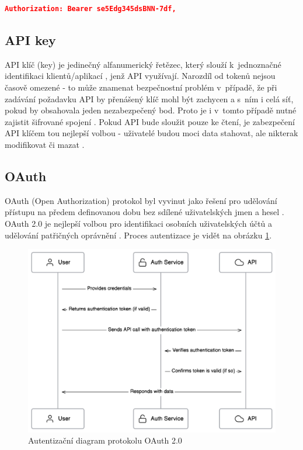 \documentclass[czech, bc, kiv, he, iso690numb]{fasthesis}
\begin{document}
\begin{lstlisting}[language=json, caption={Autorizační atribut - Bearer schéma}, label=bearerHeader]
	Authorization: Bearer se5Edg345dsBNN-7df,
\end{lstlisting}


\subsection{API key}
API klíč (key) je jedinečný alfanumerický řetězec, který slouží k~jednoznačné identifikaci klientů/aplikací \cite{amazonAPIKey}, jenž API využívají. Narozdíl od tokenů
nejsou časově omezené - to může znamenat bezpečnostní problém v~případě, že při zadávání požadavku API by přenášený klíč mohl být zachycen \cite{mostUsedAuthentication} a s~ním i celá síť, pokud by obsahovala jeden nezabezpečený bod. Proto je i v~tomto případě nutné zajistit šifrované spojení \cite{keepingApiKeysSafe}.
Pokud API bude sloužit pouze ke čtení, je zabezpečení API klíčem tou nejlepší volbou - uživatelé budou moci data stahovat, ale nikterak modifikovat či mazat \cite{mostUsedAuthentication}. 

\subsection{OAuth}
OAuth (Open Authorization) protokol byl vyvinut jako řešení pro udělování přístupu na předem definovanou dobu bez sdílené uživatelských jmen a hesel \cite{understandingOAuth2}. OAuth 2.0
je nejlepší volbou pro identifikaci osobních uživatelských účtů a udělování patřičných oprávnění \cite{mostUsedAuthentication}. Proces autentizace je vidět na obrázku \ref{fig:oauth2Diagram}.


\begin{figure}
	\centering
	\includegraphics[width=1\textwidth]{pictures/oauth2-diagram.png}
	\caption{Autentizační diagram protokolu OAuth 2.0 \cite{oAuthImage}}
	\label{fig:oauth2Diagram}
\end{figure}
\end{document}
